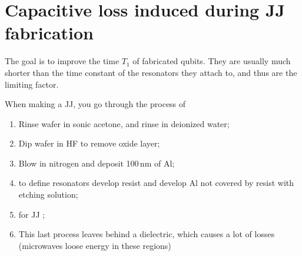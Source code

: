 
\section{Capacitive loss induced during JJ fabrication}
\label{sec:capac-loss-induc}

\begin{framed}\noindent
  The goal  is to  improve the time  $ T_{1} $  of fabricated  qubits.  They are  usually much
  shorter than the time  constant of the resonators they attach to, and  thus are the limiting
  factor.

  When making a JJ, you go through the process of
  \begin{enumerate}
  \item Rinse wafer in sonic acetone, and rinse in deionized water;
  \item Dip wafer in HF to remove oxide layer;
  \item Blow in nitrogen and deposit 100\,nm of Al;
  \item {}  to define resonators \ra develop resist  and develop Al not
    covered by resist with etching solution;
  \item {} for JJ \ira  {};
  \item This last process leaves behind a dielectric, which causes a lot of losses (microwaves
    loose energy in these regions)
  \end{enumerate}
\end{framed}
